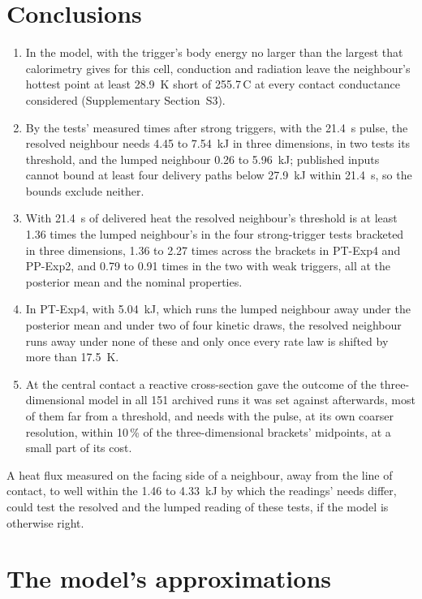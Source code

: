 \documentclass[preprint,12pt]{elsarticle}
\newcommand{\degC}{\,\textdegree C}
\begin{document}
\section{Conclusions}
\label{sec:conclusions}

\begin{enumerate}
\item In the model, with the trigger's body energy no larger than the largest that calorimetry gives for this cell, conduction and radiation leave the neighbour's hottest point at least 28.9~K short of 255.7\degC{} at every contact conductance considered (Supplementary Section~S3).
\item By the tests' measured times after strong triggers, with the 21.4~s pulse, the resolved neighbour needs 4.45 to 7.54~kJ in three dimensions, in two tests its threshold, and the lumped neighbour 0.26 to 5.96~kJ; published inputs cannot bound at least four delivery paths below 27.9~kJ within 21.4~s, so the bounds exclude neither.
\item With 21.4~s of delivered heat the resolved neighbour's threshold is at least 1.36 times the lumped neighbour's in the four strong-trigger tests bracketed in three dimensions, 1.36 to 2.27 times across the brackets in PT-Exp4 and PP-Exp2, and 0.79 to 0.91 times in the two with weak triggers, all at the posterior mean and the nominal properties.
\item In PT-Exp4, with 5.04~kJ, which runs the lumped neighbour away under the posterior mean and under two of four kinetic draws, the resolved neighbour runs away under none of these and only once every rate law is shifted by more than 17.5~K.
\item At the central contact a reactive cross-section gave the outcome of the three-dimensional model in all 151 archived runs it was set against afterwards, most of them far from a threshold, and needs with the pulse, at its own coarser resolution, within 10\,\% of the three-dimensional brackets' midpoints, at a small part of its cost.
\end{enumerate}

\noindent A heat flux measured on the facing side of a neighbour, away from the line of contact, to well within the 1.46 to 4.33~kJ by which the readings' needs differ, could test the resolved and the lumped reading of these tests, if the model is otherwise right.

\appendix
\section{The model's approximations}
\label{app:model}
\end{document}
